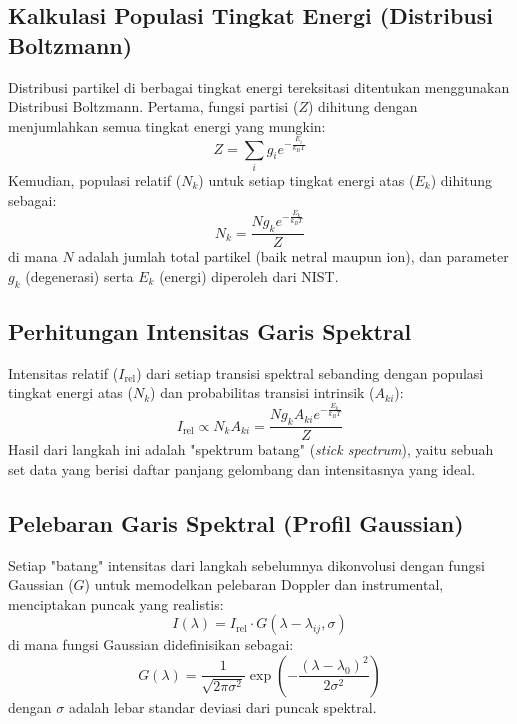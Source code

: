 \begin{onehalfspace}
\subsection*{Kalkulasi Populasi Tingkat Energi (Distribusi Boltzmann)}
Distribusi partikel di berbagai tingkat energi tereksitasi ditentukan menggunakan Distribusi Boltzmann. Pertama, fungsi partisi ($Z$) dihitung dengan menjumlahkan semua tingkat energi yang mungkin:
\begin{equation}
Z = \sum_i g_i e^{-\frac{E_i}{k_B T}}
\end{equation}
Kemudian, populasi relatif ($N_k$) untuk setiap tingkat energi atas ($E_k$) dihitung sebagai:
\begin{equation}
N_k = \frac{N g_k e^{-\frac{E_k}{k_B T}}}{Z}
\end{equation}
di mana $N$ adalah jumlah total partikel (baik netral maupun ion), dan parameter $g_k$ (degenerasi) serta $E_k$ (energi) diperoleh dari NIST.

\subsection*{Perhitungan Intensitas Garis Spektral}
Intensitas relatif ($I_{\text{rel}}$) dari setiap transisi spektral sebanding dengan populasi tingkat energi atas ($N_k$) dan probabilitas transisi intrinsik ($A_{ki}$):
\begin{equation}
I_{\text{rel}} \propto N_k A_{ki} = \frac{N g_k A_{ki} e^{-\frac{E_k}{k_B T}}}{Z}
\end{equation}
Hasil dari langkah ini adalah "spektrum batang" (\textit{stick spectrum}), yaitu sebuah set data yang berisi daftar panjang gelombang dan intensitasnya yang ideal.

\subsection*{Pelebaran Garis Spektral (Profil Gaussian)}
Setiap "batang" intensitas dari langkah sebelumnya dikonvolusi dengan fungsi Gaussian ($G$) untuk memodelkan pelebaran Doppler dan instrumental, menciptakan puncak yang realistis:
\begin{equation}
I(\lambda) = I_{\text{rel}} \cdot G(\lambda - \lambda_{ij}, \sigma)
\end{equation}
di mana fungsi Gaussian didefinisikan sebagai:
\begin{equation}
G(\lambda) = \frac{1}{\sqrt{2\pi \sigma^2}} \exp\left(-\frac{(\lambda - \lambda_0)^2}{2\sigma^2}\right)
\end{equation}
dengan $\sigma$ adalah lebar standar deviasi dari puncak spektral.


\end{onehalfspace}
